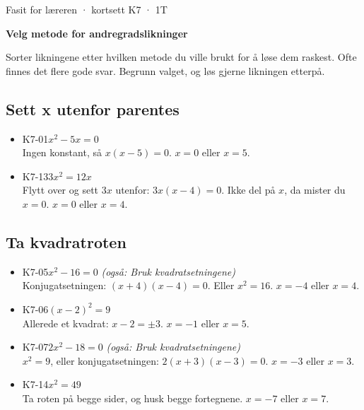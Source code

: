 \documentclass[11pt,a4paper]{article}
\begin{document}
\begin{minipage}[t]{0.8\linewidth}\vspace{0pt}
{\sffamily\small\color{dempet}Fasit for læreren · kortsett K7 · 1T}\par\vspace{0.25em}
{\fontsize{20}{24}\selectfont\bfseries Velg metode for andregradslikninger}\par\vspace{0.5em}
Sorter likningene etter hvilken metode du ville brukt for å løse dem raskest. Ofte finnes det flere gode svar. Begrunn valget, og løs gjerne likningen etterpå.\par{}
\end{minipage}\hfill
\begin{minipage}[t]{0.15\linewidth}\vspace{0pt}\raggedleft
{}
\end{minipage}\par\vspace{0.8em}

\subsection*{Sett x utenfor parentes}
\begin{itemize}[leftmargin=1.2em, itemsep=0.35em]
\item \textsf{\small K7-01}\quad $x^2 - 5x = 0$\\{\small\color{dempet}Ingen konstant, så $x(x - 5) = 0$. $x = 0$ eller $x = 5$.}
\item \textsf{\small K7-13}\quad $3x^2 = 12x$\\{\small\color{dempet}Flytt over og sett $3x$ utenfor: $3x(x - 4) = 0$. Ikke del på $x$, da mister du $x = 0$. $x = 0$ eller $x = 4$.}
\end{itemize}
\subsection*{Ta kvadratroten}
\begin{itemize}[leftmargin=1.2em, itemsep=0.35em]
\item \textsf{\small K7-05}\quad $x^2 - 16 = 0$ \emph{(også: Bruk kvadratsetningene)}\\{\small\color{dempet}Konjugatsetningen: $(x + 4)(x - 4) = 0$. Eller $x^2 = 16$. $x = -4$ eller $x = 4$.}
\item \textsf{\small K7-06}\quad $(x - 2)^2 = 9$\\{\small\color{dempet}Allerede et kvadrat: $x - 2 = \pm 3$. $x = -1$ eller $x = 5$.}
\item \textsf{\small K7-07}\quad $2x^2 - 18 = 0$ \emph{(også: Bruk kvadratsetningene)}\\{\small\color{dempet}$x^2 = 9$, eller konjugatsetningen: $2(x + 3)(x - 3) = 0$. $x = -3$ eller $x = 3$.}
\item \textsf{\small K7-14}\quad $x^2 = 49$\\{\small\color{dempet}Ta roten på begge sider, og husk begge fortegnene. $x = -7$ eller $x = 7$.}
\end{itemize}
\end{document}
